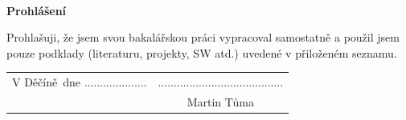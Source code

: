 \documentclass[a4paper,oneside,12pt]{book}
\newcommand{\tb}{\textbf} %
\newcommand{\woman}{} %
\newcommand{\autor}{Martin Tůma}   %
\newcommand{\kde}{Děčíně} %
\newcommand{\prohlaseni}{Prohlašuji, že jsem svou bakalářskou práci vypracoval\woman{} samostatně a použil\woman{} jsem pouze podklady (literaturu, projekty, SW atd.) uvedené v přiloženém seznamu.} %
\newcommand{\podekovani}{Děkuji ... za ...} %
\begin{document}


\newpage %
\thispagestyle{empty}  %

~ %
\vfill %

\tb{Prohlášení} %

\vspace{1em} %
\prohlaseni

\vspace{2em}  %
\hspace{-0.5em}\begin{tabularx}{\textwidth}{X c}  %
V \kde\ dne .................... &........................................ \\	%
	& \autor
\end{tabularx}	%







\newpage   %
\thispagestyle{empty}   %

\newbox\odstavecbox
\newlength\vyskaodstavce
\newcommand\odstavec[2]{%
    \setbox\odstavecbox=\hbox{%
         \parbox[t]{#1}{#2\vrule width 0pt depth 4pt}}%
    \global\vyskaodstavce=\dp\odstavecbox
    \box\odstavecbox}
\newcommand{\delka}{120mm} %
\end{document}
